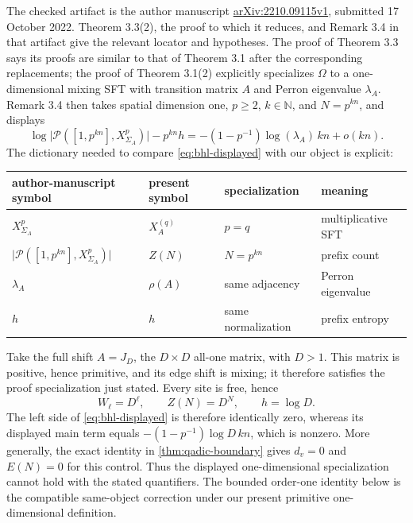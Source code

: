 The checked artifact is the author manuscript
\href{https://arxiv.org/abs/2210.09115v1}{arXiv:2210.09115v1}, submitted
17 October 2022.  Theorem 3.3(2), the proof to which it reduces, and
Remark 3.4 in that artifact give the relevant locator and hypotheses.  The
proof of Theorem 3.3 says its proofs are similar to that of Theorem 3.1 after
the corresponding replacements; the proof of Theorem 3.1(2) explicitly specializes
\(\Omega\) to a one-dimensional mixing SFT with transition matrix \(A\) and
Perron eigenvalue \(\lambda_A\).  Remark 3.4 then takes spatial dimension one,
\(p\ge2\), \(k\in\mathbb N\), and \(N=p^{kn}\), and displays
\begin{equation}
  \log\lvert\mathcal P([1,p^{kn}],X_{\Sigma_A}^{p})\rvert
  -p^{kn}h
  =-(1-p^{-1})\log(\lambda_A)\,kn+o(kn).
  \label{eq:bhl-displayed}
\end{equation}
The dictionary needed to compare \eqref{eq:bhl-displayed} with our object is
explicit:
\begin{center}
\small
\begin{tabular}{llll}
  \toprule
  author-manuscript symbol & present symbol & specialization & meaning \\
  \midrule
  \(X_{\Sigma_A}^{p}\) & \(X_A^{(q)}\) & \(p=q\) & multiplicative SFT \\
  \(\lvert\mathcal P([1,p^{kn}],X_{\Sigma_A}^{p})\rvert\)
    & \(Z(N)\) & \(N=p^{kn}\) & prefix count \\
  \(\lambda_A\) & \(\rho(A)\) & same adjacency & Perron eigenvalue \\
  \(h\) & \(h\) & same normalization & prefix entropy \\
  \bottomrule
\end{tabular}
\end{center}

Take the full shift \(A=J_D\), the \(D\times D\) all-one matrix, with
\(D>1\).  This matrix is positive, hence primitive, and its edge shift is
mixing; it therefore satisfies the proof specialization just stated.  Every
site is free, hence
\[
  W_\ell=D^\ell,\qquad Z(N)=D^N,\qquad h=\log D.
\]
The left side of \eqref{eq:bhl-displayed} is therefore identically zero,
whereas its displayed main term equals
\(-(1-p^{-1})\log D\,kn\), which is nonzero.  More generally, the exact
identity in \cref{thm:qadic-boundary} gives \(d_v=0\) and \(E(N)=0\) for
this control.  Thus the displayed one-dimensional specialization cannot
hold with the stated quantifiers.  The bounded order-one identity below is
the compatible same-object correction under our present primitive
one-dimensional definition.

